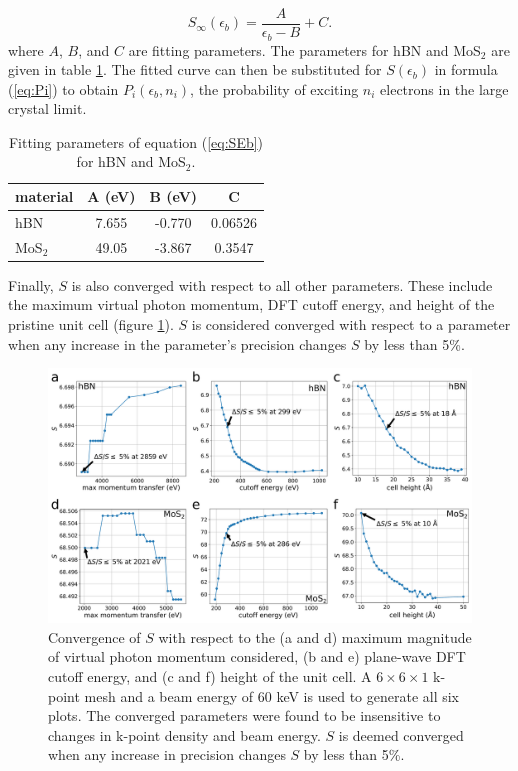 \documentclass{article}
\begin{document}
\begin{equation}
  S_\infty(\epsilon_b)
  =
  \frac{A}{\epsilon_b - B} + C.
  \label{eq:SEb}
\end{equation}
%
where $A$, $B$, and $C$ are fitting parameters.  The parameters for hBN and
MoS$_2$ are given in table \ref{tab:fit}.
The fitted curve can then be substituted for $S(\epsilon_b)$ in formula
(\ref{eq:Pi}) to obtain $P_i(\epsilon_b, n_i)$, the probability of exciting
$n_i$ electrons in the large crystal limit.

\begin{table} \centering 
  \begin{tabular}{lccc}
    \toprule
    material &A (eV) &B (eV) &C \\
    \midrule
    hBN     &7.655 &-0.770 &0.06526 \\
    MoS$_2$ &49.05 &-3.867 &0.3547 \\
    \bottomrule
  \end{tabular}
  \caption{
    Fitting parameters of equation (\ref{eq:SEb}) for hBN and MoS$_2$.
  } 
\label{tab:fit}
\end{table}

Finally, $S$ is also converged with respect to all other parameters.
These include the maximum virtual photon momentum, DFT cutoff energy, and
height of the pristine unit cell (figure \ref{fig:convergences}).
$S$ is considered converged with respect to a parameter when any increase in
the parameter's precision changes $S$ by less than 5\%.

\begin{figure}[H]
  \centering
  \includegraphics[width=\textwidth]{figures/convergences.pdf}
  \caption{
    Convergence of $S$ with respect to the (a and d) maximum magnitude of
    virtual photon momentum considered, (b and e) plane-wave DFT cutoff energy,
    and (c and f) height of the unit cell.
    A $6\times6\times1$ k-point mesh and a beam energy of 60 keV is used to
    generate all six plots.
    The converged parameters were found to be insensitive to changes in k-point
    density and beam energy.
    $S$ is deemed converged when any increase in precision changes $S$ by less
    than 5\%.
  }
  \label{fig:convergences}
\end{figure}
\break
\end{document}
